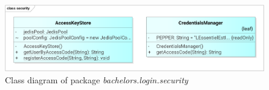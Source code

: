 \begin{figure}[h]	
	\includegraphics[width=\textwidth]{figures/classdiagrams/lssecurity}
	\centering			
	\caption{Class diagram of package \textit{bachelors.login.security}}
\end{figure}